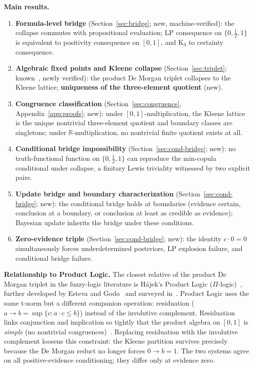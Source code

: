 \documentclass[11pt,a4paper]{article}
\newcommand{\Real}{\mathbb{R}}
\begin{document}
\textbf{Main results.}
\begin{enumerate}[nosep]
\item \textbf{Formula-level bridge} (Section~\ref{sec:bridge};
  new, machine-verified):
  the collapse commutes with propositional evaluation;
  LP consequence on $\{0, \tfrac{1}{2}, 1\}$ is equivalent to
  positivity consequence on $[0,1]$, and K$_3$ to certainty
  consequence.
\item \textbf{Algebraic fixed points and Kleene collapse}
  (Section~\ref{sec:triplet}; known~\cite{kleene1952,hajek1998,gottwald2001},
  newly verified):
  the product De Morgan triplet collapses to the Kleene lattice;
  \textbf{uniqueness of the three-element quotient} (new).
\item \textbf{Congruence classification}
  (Section~\ref{sec:congruence}, Appendix~\ref{app:proofs}; new):
  under $[0,1]$-multiplication, the Kleene lattice is the unique
  nontrivial three-element quotient and boundary classes are
  singletons; under $\Real$-multiplication, no nontrivial
  finite quotient exists at all.
\item \textbf{Conditional bridge impossibility}
  (Section~\ref{sec:cond-bridge}; new):
  no truth-functional function on $\{0, \tfrac{1}{2}, 1\}$
  can reproduce the min-copula conditional under collapse,
  a finitary Lewis triviality witnessed by two
  explicit pairs.
\item \textbf{Update bridge and boundary characterization}
  (Section~\ref{sec:cond-bridge}; new):
  the conditional bridge holds at boundaries
  (evidence certain, conclusion at a boundary, or conclusion at
  least as credible as evidence);
  Bayesian update inherits the bridge under these conditions.
\item \textbf{Zero-evidence triple}
  (Section~\ref{sec:cond-bridge}; new):
  the identity $c \cdot 0 = 0$ simultaneously forces
  underdetermined posteriors, LP explosion failure, and
  conditional bridge failure.
\end{enumerate}

\textbf{Relationship to Product Logic.}
The closest relative of the product De Morgan triplet in the
fuzzy-logic literature is H\'ajek's Product Logic
($\Pi$-logic)~\cite{hajek1998}, further developed by
Esteva and Godo~\cite{esteva2000,esteva2001} and surveyed
in~\cite{cintula2011}.
Product Logic uses the same t-norm but a different companion
operation: residuation ($a \to b = \sup\{c : a \cdot c \leq b\}$)
instead of the involutive complement.
Residuation links conjunction and implication so tightly that the
product algebra on $[0,1]$ is \emph{simple} (no nontrivial
congruences)~\cite{agliano2003}.
Replacing residuation with the involutive complement loosens this
constraint: the Kleene partition survives precisely because the
De Morgan reduct no longer forces $0 \to b = 1$.
The two systems agree on all positive-evidence conditioning;
they differ only at evidence zero.
\end{document}
